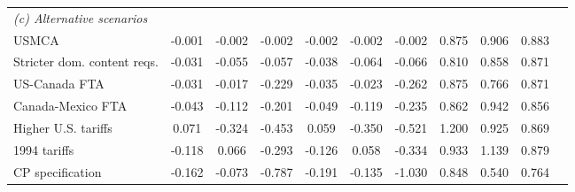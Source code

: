 \begin{table}[h!]
\begin{center}
\begin{tabular}{lcccccccccc}
\\
\multicolumn{10}{l}{\textit{(c) Alternative scenarios}}\\
USMCA& -0.001& -0.002& -0.002& -0.002& -0.002& -0.002& 0.875& 0.906& 0.883\\
Stricter dom. content reqs.& -0.031& -0.055& -0.057& -0.038& -0.064& -0.066& 0.810& 0.858& 0.871\\
US-Canada FTA& -0.031& -0.017& -0.229& -0.035& -0.023& -0.262& 0.875& 0.766& 0.871\\
Canada-Mexico FTA& -0.043& -0.112& -0.201& -0.049& -0.119& -0.235& 0.862& 0.942& 0.856\\
Higher U.S. tariffs& 0.071& -0.324& -0.453& 0.059& -0.350& -0.521& 1.200& 0.925& 0.869\\
1994 tariffs& -0.118& 0.066& -0.293& -0.126& 0.058& -0.334& 0.933& 1.139& 0.879\\
CP specification& -0.162& -0.073& -0.787& -0.191& -0.135& -1.030& 0.848& 0.540& 0.764\\
\bottomrule
\end{tabular}
\end{center}
\normalsize
\end{table}
